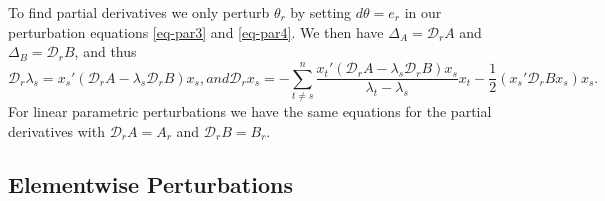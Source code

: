 \documentclass[
  12pt,
  letterpaper,
  DIV=11,
  numbers=noendperiod]{scrartcl}
\begin{document}
To find partial derivatives we only perturb \(\theta_r\) by setting
\(d\theta=e_r\) in our perturbation equations \eqref{eq-par3} and
\eqref{eq-par4}. We then have \(\Delta_A=\mathcal{D}_rA\) and
\(\Delta_B=\mathcal{D}_rB\), and thus \begin{subequations}
\begin{equation}
\mathcal{D}_r\lambda_s=x_s'(\mathcal{D}_rA-\lambda_s\mathcal{D}_rB)x_s,\label{eq-parper1}
\end{equation}
and
\begin{equation}
\mathcal{D}_rx_s=-\sum_{t\not= s}^n\frac{x_t'(\mathcal{D}_rA-\lambda_s\mathcal{D}_rB)x_s}{\lambda_t-\lambda_s}x_t-\frac12(x_s'\mathcal{D}_rBx_s)x_s.\label{eq-parper2}
\end{equation}
\end{subequations} For linear parametric perturbations we have the same
equations for the partial derivatives with \(\mathcal{D}_rA=A_r\) and
\(\mathcal{D}_rB=B_r\).

\subsection{Elementwise Perturbations}\label{sec-parelementwise}
\end{document}
